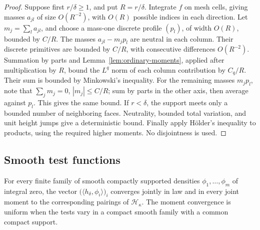 \begin{proof}
Suppose first \(r/\delta\ge1\), and put \(R=r/\delta\).
Integrate \(f\) on mesh cells, giving masses \(a_{jl}\) of size
\(O(R^{-2})\), with \(O(R)\) possible indices in each direction.
Let \(m_j=\sum_l a_{jl}\), and choose a mass-one discrete profile
\((p_l)\), of width \(O(R)\), bounded by \(C/R\).
The masses \(a_{jl}-m_jp_l\) are neutral in each column. Their discrete
primitives are bounded by \(C/R\), with consecutive differences
\(O(R^{-2})\). Summation by parts and
Lemma~\ref{lem:ordinary-moments}, applied after multiplication by \(R\),
bound the \(L^q\) norm of each column contribution by \(C_q/R\).
Their sum is bounded by Minkowski's inequality.
For the remaining masses \(m_jp_l\), note that
\(\sum_jm_j=0\), \(|m_j|\le C/R\); sum by parts in the other axis,
then average against \(p_l\). This gives the same bound.
If \(r<\delta\), the support meets only a bounded number of neighboring
faces. Neutrality, bounded total variation, and unit height jumps give
a deterministic bound. Finally apply Hölder's inequality to products,
using the required higher moments. No disjointness is used.
\end{proof}

\subsection{Smooth test functions}

\begin{proposition}\label{prop:smooth-tests}
For every finite family of smooth compactly supported densities
\(\phi_1,\ldots,\phi_m\) of integral zero, the vector
\(\bigl(\langle h_\delta,\phi_i\rangle\bigr)_i\) converges jointly in law
and in every joint moment to the corresponding pairings of
\(\mathcal H_\kappa\). The moment convergence is uniform when the tests
vary in a compact smooth family with a common compact support.
\end{proposition}

